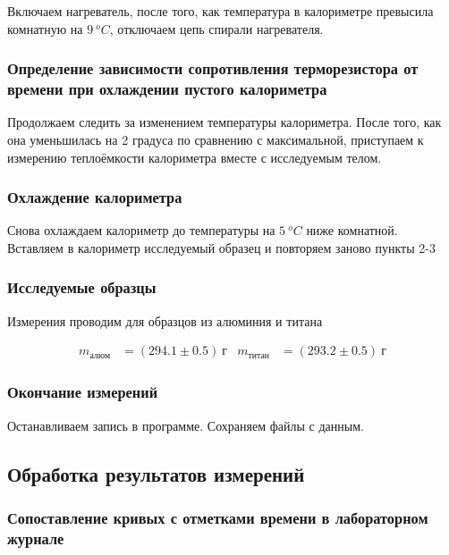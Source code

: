 \documentclass[a4paper, 12pt]{article}
\begin{document}
                Включаем нагреватель, после того, как температура в калориметре превысила комнатную на $9~^oC$, отключаем цепь спирали нагревателя.

            \subsubsection{Определение зависимости сопротивления терморезистора от времени при охлаждении пустого калориметра}

                Продолжаем следить за изменением температуры калориметра. После того, как она уменьшилась на 2 градуса по сравнению с максимальной, приступаем к измерению теплоёмкости калориметра вместе с исследуемым телом.

            \subsubsection{Охлаждение калориметра}

                Снова охлаждаем калориметр до температуры на $5~^oC$ ниже комнатной. Вставляем в калориметр исследуемый образец и повторяем заново пункты 2-3

            \subsubsection{Исследуемые образцы}

                Измерения проводим для образцов из алюминия и титана

                \begin{align*}
                    m_{алюм} &= (294.1 \pm 0.5)~г & m_{титан} &= (293.2 \pm 0.5)~г
                \end{align*}

            \subsubsection{Окончание измерений}

                Останавливаем запись в программе. Сохраняем файлы с данным.

        \subsection{Обработка результатов измерений}

            \subsubsection{Сопоставление кривых с отметками времени в лабораторном журнале}
\end{document}

